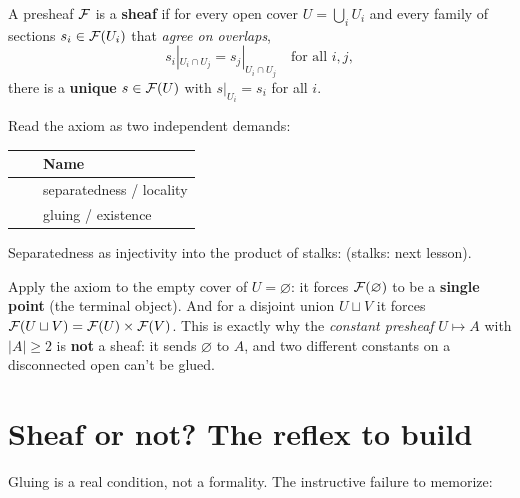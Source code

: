 \begin{defbox}
A presheaf $\mathcal{F}$ is a \textbf{sheaf} if for every open cover $U=\bigcup_i U_i$ and every family of
sections $s_i\in\mathcal{F}(U_i)$ that \emph{agree on overlaps},
\[
  s_i|_{U_i\cap U_j}=s_j|_{U_i\cap U_j}\quad\text{for all }i,j,
\]
there is a \textbf{unique} $s\in\mathcal{F}(U)$ with $s|_{U_i}=s_i$ for all
$i$.
\end{defbox}

Read the axiom as two independent demands:

\begin{center}
\begin{tabular}{@{}L{3.4cm}L{6.2cm}L{3.3cm}@{}}
\toprule
{} &  & Name\\
\midrule
{} &  &
  separatedness / locality\\[2pt]
 &  &
  gluing / existence\\
\bottomrule
\end{tabular}
\end{center}

\noindent\footnotesize Separatedness as injectivity into the product of stalks: 
(stalks: next lesson).\normalsize

\begin{warnbox}
Apply the axiom to the empty cover of $U=\varnothing$: it forces $\mathcal{F}(\varnothing)$ to be a
\textbf{single point} (the terminal object). And for a disjoint union $U\sqcup V$ it forces
$\mathcal{F}(U\sqcup V)=\mathcal{F}(U)\times\mathcal{F}(V)$. This is
exactly why the \emph{constant presheaf} $U\mapsto A$ with $|A|\ge 2$ is \textbf{not} a sheaf: it
sends $\varnothing$ to $A$, and two different constants on a disconnected open can't be glued.
\end{warnbox}

\section{Sheaf or not? The reflex to build}
Gluing is a real condition, not a formality. The instructive failure to memorize:

